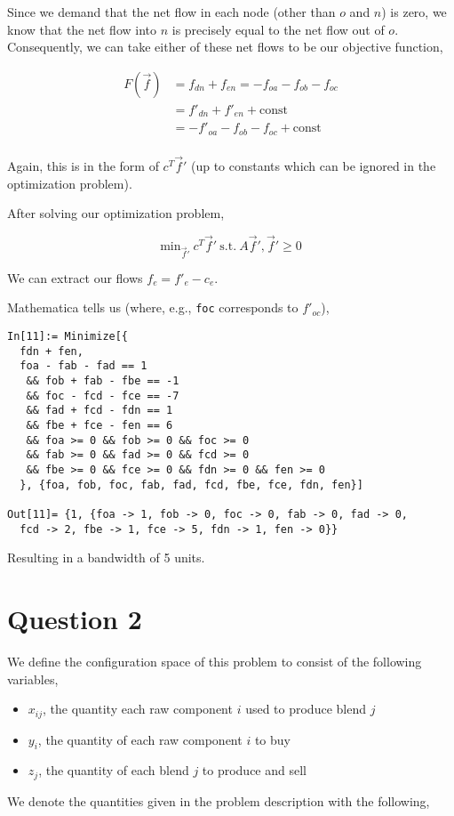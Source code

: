 \documentclass{article}
\begin{document}
Since we demand that the net flow in each node (other than $o$ and
$n$) is zero, we know that the net flow into $n$ is precisely equal to
the net flow out of $o$. Consequently, we can take either of these net
flows to be our objective function,

\begin{align*}
  F(\vec f) & = f_{dn} + f_{en} = - f_{oa} - f_{ob} - f_{oc} \\
            & = f'_{dn} + f'_{en} + \mathrm{const} \\
            & = - f'_{oa} - f_{ob} - f_{oc} + \mathrm{const} \\
\end{align*}

Again, this is in the form of $c^T \vec f'$ (up to constants which
can be ignored in the optimization problem).

After solving our optimization problem,

\[ \mathrm{min}_{\vec f'} ~ c^T \vec f' ~ \mathrm{s.t.} ~ A \vec f', \vec f' \ge 0 \]

We can extract our flows $f_e = f'_e - c_e$.

Mathematica tells us (where, e.g., {\tt foc} corresponds to $f'_{oc}$),

\begin{lstlisting}
In[11]:= Minimize[{
  fdn + fen,
  foa - fab - fad == 1
   && fob + fab - fbe == -1
   && foc - fcd - fce == -7
   && fad + fcd - fdn == 1
   && fbe + fce - fen == 6
   && foa >= 0 && fob >= 0 && foc >= 0
   && fab >= 0 && fad >= 0 && fcd >= 0
   && fbe >= 0 && fce >= 0 && fdn >= 0 && fen >= 0
  }, {foa, fob, foc, fab, fad, fcd, fbe, fce, fdn, fen}]

Out[11]= {1, {foa -> 1, fob -> 0, foc -> 0, fab -> 0, fad -> 0,
  fcd -> 2, fbe -> 1, fce -> 5, fdn -> 1, fen -> 0}}
\end{lstlisting}

Resulting in a bandwidth of 5 units.

\section{Question 2}

We define the configuration space of this problem to consist of the
following variables,

\begin{itemize}
  \item $x_{ij}$, the quantity each raw component $i$ used to produce blend $j$

  \item $y_i$, the quantity of each raw component $i$ to buy

  \item $z_j$, the quantity of each blend $j$ to produce and sell
\end{itemize}
%
We denote the quantities given in the problem description with the following,
\end{document}
